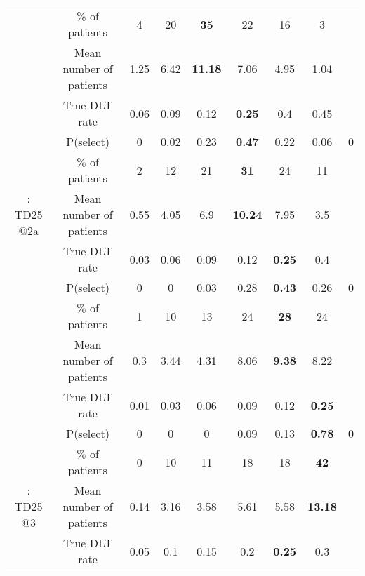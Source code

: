 \begin{table}[h!]
\begin{singlespace}
{\begin{tabular}[t]{ccccccccc}
			\rowcolor{gray!6}   & \% of patients & 4 & 20 & \textbf{35} & 22 & 16 & 3 & \\
			
			\rowcolor{gray!6}  \multirow{-4}{*}{\centering\arraybackslash 3: TD25 @1} & Mean number of patients & 1.25 & 6.42 & \textbf{11.18} & 7.06 & 4.95 & 1.04 & \\
			\cmidrule{1-9}
			& True DLT rate & 0.06 & 0.09 & 0.12 & \textbf{0.25} & 0.4 & 0.45 & \\
			
			& P(select) & 0 & 0.02 & 0.23 & \textbf{0.47} & 0.22 & 0.06 & 0\\
			
			& \% of patients & 2 & 12 & 21 & \textbf{31} & 24 & 11 & \\
			
			\multirow{-4}{*}{\centering\arraybackslash 4: TD25 @2a} & Mean number of patients & 0.55 & 4.05 & 6.9 & \textbf{10.24} & 7.95 & 3.5 & \\
			\cmidrule{1-9}
			\rowcolor{gray!6}   & True DLT rate & 0.03 & 0.06 & 0.09 & 0.12 & \textbf{0.25} & 0.4 & \\
			
			\rowcolor{gray!6}   & P(select) & 0 & 0 & 0.03 & 0.28 & \textbf{0.43} & 0.26 & 0\\
			
			\rowcolor{gray!6}   & \% of patients & 1 & 10 & 13 & 24 & \textbf{28} & 24 & \\
			
			\rowcolor{gray!6}  \multirow{-4}{*}{\centering\arraybackslash 5: TD25 @2b} & Mean number of patients & 0.3 & 3.44 & 4.31 & 8.06 & \textbf{9.38} & 8.22 & \\
			\cmidrule{1-9}
			& True DLT rate & 0.01 & 0.03 & 0.06 & 0.09 & 0.12 & \textbf{0.25} & \\
			
			& P(select) & 0 & 0 & 0 & 0.09 & 0.13 & \textbf{0.78} & 0\\
			
			& \% of patients & 0 & 10 & 11 & 18 & 18 & \textbf{42} & \\
			
			\multirow{-4}{*}{\centering\arraybackslash 6: TD25 @3} & Mean number of patients & 0.14 & 3.16 & 3.58 & 5.61 & 5.58 & \textbf{13.18} & \\
			\cmidrule{1-9}
			\rowcolor{gray!6}   & True DLT rate & 0.05 & 0.1 & 0.15 & 0.2 & \textbf{0.25} & 0.3 & \\
			

\end{tabular}}
\end{singlespace}
\end{table}
